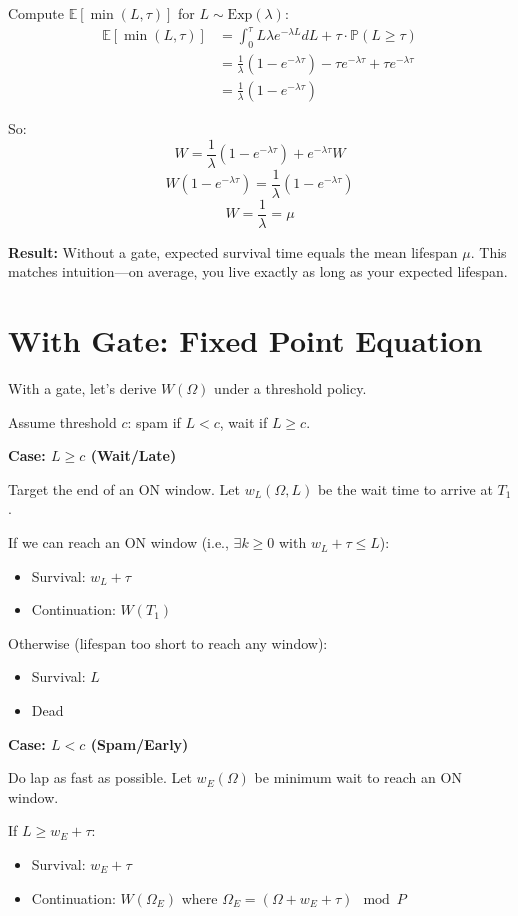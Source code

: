 \documentclass{article}
\newcommand{\E}{\mathbb{E}}
\newcommand{\Prob}{\mathbb{P}}
\begin{document}
Compute $\E[\min(L, \tau)]$ for $L \sim \text{Exp}(\lambda)$:
\begin{align*}
\E[\min(L, \tau)] &= \int_0^\tau L \lambda e^{-\lambda L} dL + \tau \cdot \Prob(L \geq \tau) \\
&= \frac{1}{\lambda}(1 - e^{-\lambda\tau}) - \tau e^{-\lambda\tau} + \tau e^{-\lambda\tau} \\
&= \frac{1}{\lambda}(1 - e^{-\lambda\tau})
\end{align*}

So:
\[
W = \frac{1}{\lambda}(1 - e^{-\lambda\tau}) + e^{-\lambda\tau} W
\]
\[
W(1 - e^{-\lambda\tau}) = \frac{1}{\lambda}(1 - e^{-\lambda\tau})
\]
\[
W = \frac{1}{\lambda} = \mu
\]

\textbf{Result:} Without a gate, expected survival time equals the mean lifespan $\mu$. This matches intuition—on average, you live exactly as long as your expected lifespan.

\section{With Gate: Fixed Point Equation}

With a gate, let's derive $W(\Omega)$ under a threshold policy.

Assume threshold $c$: spam if $L < c$, wait if $L \geq c$.

\textbf{Case: $L \geq c$ (Wait/Late)}

Target the end of an ON window. Let $w_L(\Omega, L)$ be the wait time to arrive at $T_1$.

If we can reach an ON window (i.e., $\exists k \geq 0$ with $w_L + \tau \leq L$):
\begin{itemize}
    \item Survival: $w_L + \tau$
    \item Continuation: $W(T_1)$
\end{itemize}

Otherwise (lifespan too short to reach any window):
\begin{itemize}
    \item Survival: $L$
    \item Dead
\end{itemize}

\textbf{Case: $L < c$ (Spam/Early)}

Do lap as fast as possible. Let $w_E(\Omega)$ be minimum wait to reach an ON window.

If $L \geq w_E + \tau$:
\begin{itemize}
    \item Survival: $w_E + \tau$
    \item Continuation: $W(\Omega_E)$ where $\Omega_E = (\Omega + w_E + \tau) \mod P$
\end{itemize}
\end{document}
